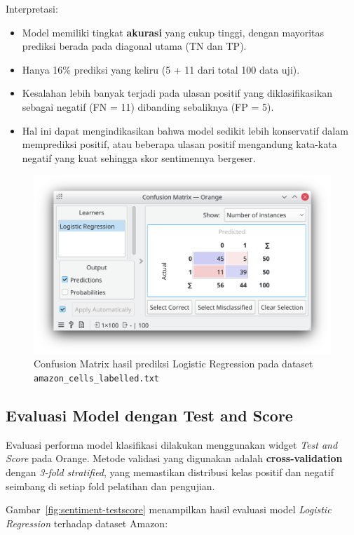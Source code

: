 Interpretasi:
\begin{itemize}
	\item Model memiliki tingkat \textbf{akurasi} yang cukup tinggi, dengan mayoritas prediksi berada pada diagonal utama (TN dan TP).
	\item Hanya 16\% prediksi yang keliru (5 + 11 dari total 100 data uji).
	\item Kesalahan lebih banyak terjadi pada ulasan positif yang diklasifikasikan sebagai negatif (FN = 11) dibanding sebaliknya (FP = 5).
	\item Hal ini dapat mengindikasikan bahwa model sedikit lebih konservatif dalam memprediksi positif, atau beberapa ulasan positif mengandung kata-kata negatif yang kuat sehingga skor sentimennya bergeser.
\end{itemize}

\begin{figure}[h]
	\centering
	\includegraphics[width=0.6\linewidth]{../figures/sentiment_confusion_matrix.png}
	\caption{Confusion Matrix hasil prediksi Logistic Regression pada dataset \texttt{amazon\_cells\_labelled.txt}}
	\label{fig:sentiment-confmatrix}
\end{figure}


\subsection*{Evaluasi Model dengan Test and Score}

Evaluasi performa model klasifikasi dilakukan menggunakan widget \textit{Test and Score} pada Orange. Metode validasi yang digunakan adalah \textbf{cross-validation} dengan \textit{3-fold stratified}, yang memastikan distribusi kelas positif dan negatif seimbang di setiap fold pelatihan dan pengujian.

Gambar~\ref{fig:sentiment-testscore} menampilkan hasil evaluasi model \textit{Logistic Regression} terhadap dataset Amazon:

